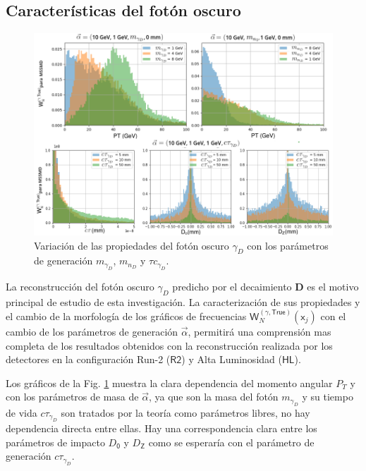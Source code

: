 \subsection{Características del fotón oscuro}
\begin{figure}[!h]
\centering
\includegraphics[width=.9\textwidth]{Cap4/imagenes/True_PT5.png}
\caption{Variación de las propiedades del fotón oscuro $\gamma_D$ con los parámetros de generación $m_{\gamma_D}$, $m_{n_D}$ y $\tau c_{\gamma_D}$.}
\label{PT_mu_True2}
\end{figure}
La reconstrucción del fotón oscuro $\gamma_D$ predicho por el decaimiento \MSSM\textbf{D} es el motivo principal de estudio de esta investigación. La caracterización de sus propiedades y el cambio de la morfología de los gráficos de frecuencias $\textsf{W}^{(\gamma , \textsf{True})}_N (\textsf{x}_j)$ con el cambio de los parámetros de generación $\vec{\alpha}$, permitirá una comprensión mas completa de los resultados obtenidos con la reconstrucción realizada por los detectores en la configuración Run-2 ($\textsf{R2}$) y Alta Luminosidad ($\textsf{HL}$).




Los gráficos de la Fig. \ref{PT_mu_True2} muestra la clara dependencia del momento angular $P_T$ y con los parámetros de masa de $\vec{\alpha}$, ya que son la masa del fotón $m_{\gamma_D}$ y su tiempo de vida $c\tau_{\gamma_D}$ son tratados por la teoría como parámetros libres, no hay dependencia directa entre ellas. Hay una correspondencia clara entre los parámetros de impacto $D_\textsf{0}$ y $D_\textsf{Z}$ como se esperaría con el parámetro de generación $c\tau_{\gamma_D}$.







